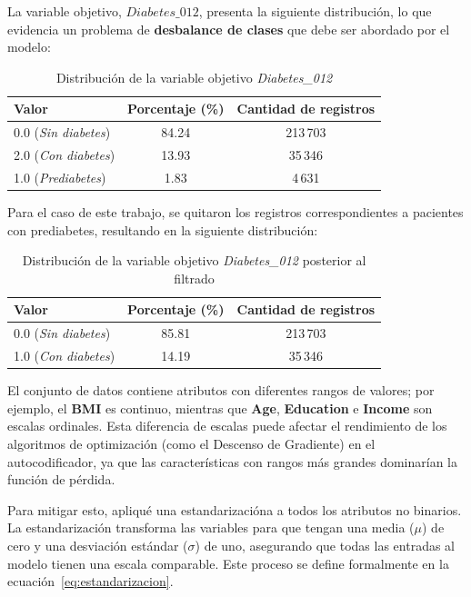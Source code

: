 \documentclass[a4paper,10pt]{book}
\begin{document}
La variable objetivo, $\textit{Diabetes\_012}$, presenta la siguiente distribución, lo que evidencia un problema de \textbf{desbalance de clases} que debe ser abordado por el modelo:

\begin{table}[H]
	\centering
	\caption{Distribución de la variable objetivo \textit{Diabetes\_012}}
	\begin{tabular}{lcc}
		\toprule
		\textbf{Valor} & \textbf{Porcentaje (\%)} & \textbf{Cantidad de registros} \\
		\midrule
		0.0 (\textit{Sin diabetes}) & 84.24 & 213\,703 \\
		2.0 (\textit{Con diabetes}) & 13.93 & 35\,346 \\
		1.0 (\textit{Prediabetes})  & 1.83  & 4\,631 \\
		\bottomrule
	\end{tabular}
	\label{tab:diabetes_012}
\end{table}

Para el caso de este trabajo, se quitaron los registros correspondientes a pacientes con prediabetes, resultando en la siguiente distribución:

\begin{table}[H]
	\centering
	\caption{Distribución de la variable objetivo \textit{Diabetes\_012} posterior al filtrado}
	\begin{tabular}{lcc}
		\toprule
		\textbf{Valor} & \textbf{Porcentaje (\%)} & \textbf{Cantidad de registros} \\
		\midrule
		0.0 (\textit{Sin diabetes}) & 85.81 & 213\,703 \\
		1.0 (\textit{Con diabetes}) & 14.19 & 35\,346 \\
		\bottomrule
	\end{tabular}
	\label{tab:diabetes_012_filtrado}
\end{table}


El conjunto de datos contiene atributos con diferentes rangos de valores; por ejemplo, el \textbf{BMI} es continuo, mientras que \textbf{Age}, \textbf{Education} e \textbf{Income} son escalas ordinales. Esta diferencia de escalas puede afectar el rendimiento de los algoritmos de optimización (como el Descenso de Gradiente) en el autocodificador, ya que las características con rangos más grandes dominarían la función de pérdida.

Para mitigar esto, apliqué una estandarizacióna a todos los atributos no binarios. La estandarización transforma las variables para que tengan una media ($\mu$) de cero y una desviación estándar ($\sigma$) de uno, asegurando que todas las entradas al modelo tienen una escala comparable. Este proceso se define formalmente en la ecuación~\ref{eq:estandarizacion}.
\end{document}
